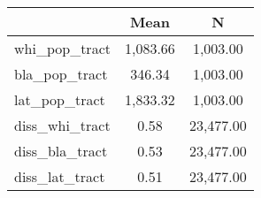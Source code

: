{
\def\sym#1{\ifmmode^{#1}\else\(^{#1}\)\fi}
\begin{tabular}{l*{1}{cc}}
\hline\hline
                    &        Mean&           N\\
\hline
whi\_pop\_tract       &    1,083.66&    1,003.00\\
bla\_pop\_tract       &      346.34&    1,003.00\\
lat\_pop\_tract       &    1,833.32&    1,003.00\\
diss\_whi\_tract      &        0.58&   23,477.00\\
diss\_bla\_tract      &        0.53&   23,477.00\\
diss\_lat\_tract      &        0.51&   23,477.00\\
\hline\hline
\end{tabular}
}
